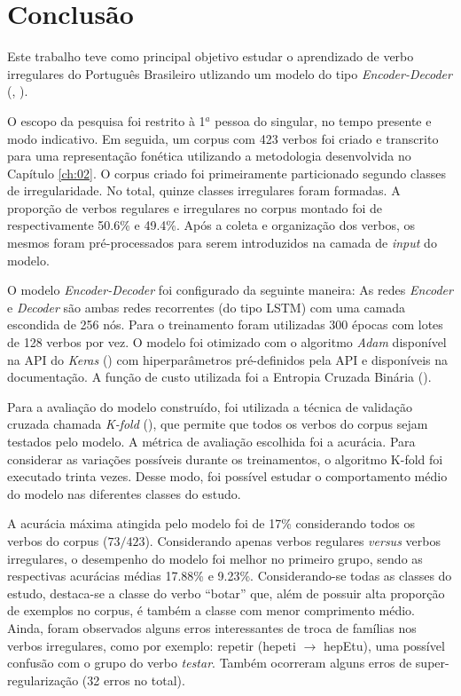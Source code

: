 \chapter{Conclusão}
\label{ch:08}

Este trabalho teve como principal objetivo estudar o aprendizado de verbo irregulares do Português Brasileiro utlizando um modelo do tipo \textit{Encoder-Decoder} (\cite{enc-dec:2014}, \cite{seq2seq:2014}). 

O escopo da pesquisa foi restrito à 1$^{a}$ pessoa do singular, no tempo presente e modo indicativo. Em seguida, um corpus com 423 verbos foi criado e transcrito para uma representação fonética utilizando a metodologia desenvolvida no Capítulo \ref{ch:02}. O corpus criado foi primeiramente particionado segundo classes de irregularidade. No total, quinze classes irregulares foram formadas. A proporção de verbos regulares e irregulares no corpus montado foi de respectivamente 50.6\% e 49.4\%. Após a coleta e organização dos verbos, os mesmos foram pré-processados para serem introduzidos na camada de \textit{input} do modelo. 

O modelo \textit{Encoder-Decoder} foi configurado da seguinte maneira: As redes \textit{Encoder} e \textit{Decoder} são ambas redes recorrentes (do tipo LSTM) com uma camada escondida de 256 nós. Para o treinamento foram utilizadas 300 épocas com lotes de 128 verbos por vez. O modelo foi otimizado com o algoritmo \textit{Adam} disponível na API do \textit{Keras} (\cite{chollet2015keras}) com hiperparâmetros pré-definidos pela API e disponíveis na documentação. A função de custo utilizada foi a Entropia Cruzada Binária (\cite{francois2017deep}).

Para a avaliação do modelo construído, foi utilizada a técnica de validação cruzada chamada \textit{K-fold} (\cite{kfold:2018}), que permite que todos os verbos do corpus sejam testados pelo modelo. A métrica de avaliação escolhida foi a acurácia. Para considerar as variações possíveis durante os treinamentos, o algoritmo K-fold foi executado trinta vezes. Desse modo, foi possível estudar o comportamento médio do modelo nas diferentes classes do estudo.

A acurácia máxima atingida pelo modelo foi de 17\% considerando todos os verbos do corpus ($73/423$). Considerando apenas verbos regulares \textit{versus} verbos irregulares, o desempenho do modelo foi melhor no primeiro grupo, sendo as respectivas acurácias médias 17.88\% e 9.23\%. Considerando-se todas as classes do estudo, destaca-se a classe do verbo “botar” que, além de possuir alta proporção de exemplos no corpus, é também a classe com menor comprimento médio. Ainda, foram observados alguns erros interessantes de troca de famílias nos verbos irregulares, como por exemplo: repetir (hepeti $\rightarrow$ hepEtu), uma possível confusão com o grupo do verbo \textit{testar}. Também ocorreram alguns erros de super-regularização (32 erros no total). 

